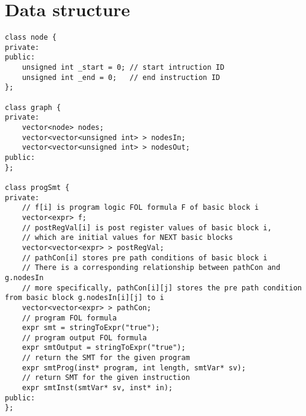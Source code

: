 \documentclass{article}
\begin{document}
\section{Data structure}
\begin{lstlisting}[caption={}]
class node {
private:
public:
	unsigned int _start = 0; // start intruction ID
	unsigned int _end = 0;   // end instruction ID
};

class graph {
private:
	vector<node> nodes;
	vector<vector<unsigned int> > nodesIn;
	vector<vector<unsigned int> > nodesOut;
public:
};

class progSmt {
private:
	// f[i] is program logic FOL formula F of basic block i
	vector<expr> f;
	// postRegVal[i] is post register values of basic block i,
	// which are initial values for NEXT basic blocks
	vector<vector<expr> > postRegVal;
	// pathCon[i] stores pre path conditions of basic block i
	// There is a corresponding relationship between pathCon and g.nodesIn
	// more specifically, pathCon[i][j] stores the pre path condition from basic block g.nodesIn[i][j] to i
	vector<vector<expr> > pathCon;
	// program FOL formula
	expr smt = stringToExpr("true");
	// program output FOL formula
	expr smtOutput = stringToExpr("true");
	// return the SMT for the given program
	expr smtProg(inst* program, int length, smtVar* sv);
	// return SMT for the given instruction
	expr smtInst(smtVar* sv, inst* in);
public:
};
\end{lstlisting}
\end{document}
